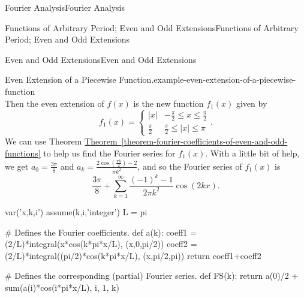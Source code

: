 \documentclass[10pt,]{book}
\numberwithin{equation}{section}
\begin{document}
\begin{chapterptx}{Fourier Analysis}{}{Fourier Analysis}{}{}
\begin{sectionptx}{Functions of Arbitrary Period; Even and Odd Extensions}{}{Functions of Arbitrary Period; Even and Odd Extensions}{}{}
\begin{subsectionptx}{Even and Odd Extensions}{}{Even and Odd Extensions}{}{}
\begin{example}{Even Extension of a Piecewise Function.}{example-even-extension-of-a-piecewise-function}
\begin{equation*}
\end{equation*}
Then the even extension of \(f(x)\) is the new function \(f_{1}(x)\) given by%
\begin{equation*}
f_{1}(x) = \begin{cases}|x| & -\frac{\pi}{2}\leq x\leq \frac{\pi}{2} \\ \frac{\pi}{2} & \frac{\pi}{2}\leq |x|\leq \pi\end{cases}.
\end{equation*}
We can use Theorem \hyperref[theorem-fourier-coefficients-of-even-and-odd-functions]{Theorem~\ref{theorem-fourier-coefficients-of-even-and-odd-functions}} to help us find the Fourier series for \(f_{1}(x)\). With a little bit of help, we get \(a_{0} = \frac{3\pi}{8}\) and \(a_{k} = \frac{2\cos(\frac{\pi k}{2})-2}{\pi k^{2}}\), and so the Fourier series of \(f_{1}(x)\) is%
\begin{equation*}
\frac{3\pi}{8}+\sum_{k=1}^{\infty}\frac{(-1)^{k}-1}{2\pi k^{2}}\cos(2kx).
\end{equation*}
%
\end{example}
\begin{sageinput}
var('x,k,i')
assume(k,i,'integer')
L = pi

# Defines the Fourier coefficients.
def a(k):
coeff1 = (2/L)*integral(x*cos(k*pi*x/L), (x,0,pi/2))
coeff2 = (2/L)*integral((pi/2)*cos(k*pi*x/L), (x,pi/2,pi))
return coeff1+coeff2

# Defines the corresponding (partial) Fourier series.
def FS(k): 
return a(0)/2 + sum(a(i)*cos(i*pi*x/L), i, 1, k)


\end{sageinput}
\end{subsectionptx}
\end{sectionptx}
\end{chapterptx}
\end{document}
